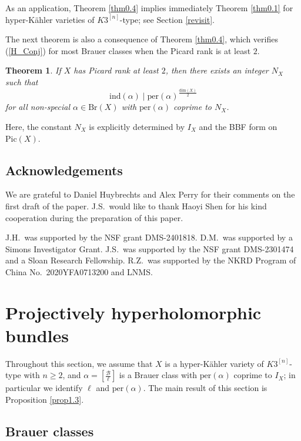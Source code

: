 \documentclass[11pt]{amsart}
\theoremstyle{plain}
\newtheorem{thm}{Theorem}[section]
\theoremstyle{definition}
\theoremstyle{remark}
\newcommand{\CB}{{\mathcal B}}
\begin{document}
As an application, Theorem \ref{thm0.4} implies immediately Theorem \ref{thm0.1} for hyper-K\"ahler varieties of $K3^{[n]}$-type; see Section \ref{revisit}. 

The next theorem is also a consequence of Theorem \ref{thm0.4}, which verifies (\ref{H_Conj}) for most Brauer classes when the Picard rank is at least $2$.

\begin{thm}\label{thm0.6}
    If $X$ has Picard rank at least $2$, then there exists an integer $N_X$ such that 
    \[
\mathrm{ind}(\alpha) \mid \mathrm{per}(\alpha)^{\frac{\mathrm{dim}(X)}{2}}    
\]
for all non-special $\alpha \in \mathrm{Br}(X)$ with $\mathrm{per}(\alpha)$ coprime to $N_X$.
\end{thm}

Here, the constant $N_X$ is explicitly determined by $I_X$ and the BBF form on $\mathrm{Pic}(X)$.









\subsection{Acknowledgements}
We are grateful to Daniel Huybrechts and Alex Perry for their comments on the first draft of the paper. J.S.~would like to thank Haoyi Shen for his kind cooperation during the preparation of this paper.


J.H.~was supported by the NSF grant DMS-2401818. D.M.~was supported by a Simons Investigator Grant. J.S.~was supported by the NSF grant DMS-2301474 and a Sloan Research Fellowship. R.Z.~was supported by the NKRD Program of China No.~2020YFA0713200 and LNMS.





\section{Projectively hyperholomorphic bundles}

Throughout this section, we assume that $X$ is a hyper-K\"ahler variety of $K3^{[n]}$-type with $n \geq 2$, and $\alpha = \left[\frac{\CB}{\ell}\right]$ is a Brauer class with $\mathrm{per}(\alpha)$ coprime to $I_X$; in particular we identify $\ell$ and $\mathrm{per}(\alpha)$. The main result of this section is Proposition \ref{prop1.3}.

\subsection{Brauer classes}
\end{document}
